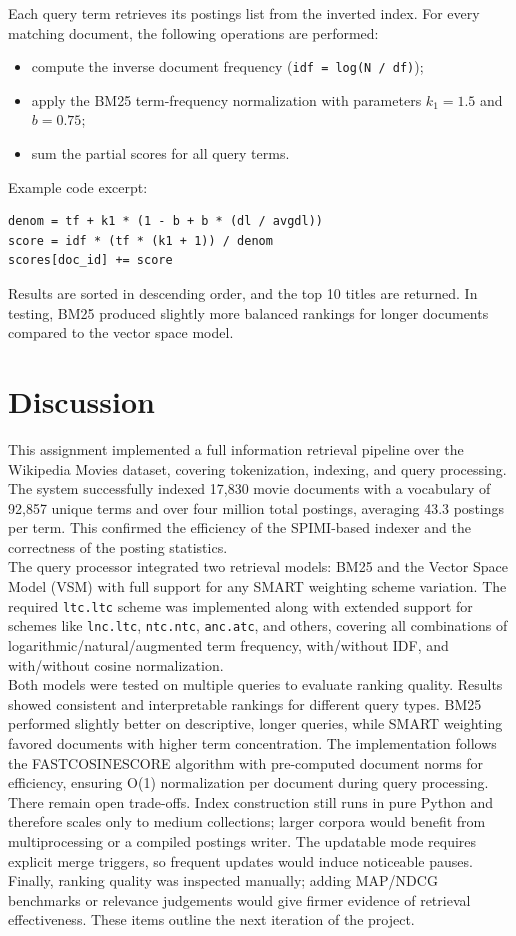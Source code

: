\documentclass[11pt,a4paper]{article}
\begin{document}
Each query term retrieves its postings list from the inverted index. 
For every matching document, the following operations are performed:
\begin{itemize}
    \item compute the inverse document frequency (\texttt{idf = log(N / df)});
    \item apply the BM25 term-frequency normalization with parameters $k_1=1.5$ and $b=0.75$;
    \item sum the partial scores for all query terms.
\end{itemize}

Example code excerpt:
\begin{verbatim}
denom = tf + k1 * (1 - b + b * (dl / avgdl))
score = idf * (tf * (k1 + 1)) / denom
scores[doc_id] += score
\end{verbatim}

Results are sorted in descending order, and the top 10 titles are returned. 
In testing, BM25 produced slightly more balanced rankings for longer documents 
compared to the vector space model.
\newpage
\section{Discussion}
\label{sec:conclusion}
This assignment implemented a full information retrieval pipeline over the Wikipedia Movies dataset, 
covering tokenization, indexing, and query processing. 
The system successfully indexed 17,830 movie documents with a vocabulary of 92,857 unique terms 
and over four million total postings, averaging 43.3 postings per term. 
This confirmed the efficiency of the SPIMI-based indexer and the correctness of the posting statistics.
\\
The query processor integrated two retrieval models: 
BM25 and the Vector Space Model (VSM) with full support for any SMART weighting scheme variation. 
The required \texttt{ltc.ltc} scheme was implemented along with extended support for schemes like 
\texttt{lnc.ltc}, \texttt{ntc.ntc}, \texttt{anc.atc}, and others, covering all combinations of 
logarithmic/natural/augmented term frequency, with/without IDF, and with/without cosine normalization.
\\
Both models were tested on multiple queries to evaluate ranking quality. 
Results showed consistent and interpretable rankings for different query types. 
BM25 performed slightly better on descriptive, longer queries, while SMART weighting favored 
documents with higher term concentration. The implementation follows the FASTCOSINESCORE algorithm 
with pre-computed document norms for efficiency, ensuring O(1) normalization per document during 
query processing.
\\
There remain open trade-offs. Index construction still runs in pure Python and therefore
scales only to medium collections; larger corpora would benefit from multiprocessing or a
compiled postings writer. The updatable mode requires explicit merge triggers, so frequent
updates would induce noticeable pauses. Finally, ranking quality was inspected manually;
adding MAP/NDCG benchmarks or relevance judgements would give firmer evidence of retrieval
effectiveness. These items outline the next iteration of the project.
\end{document}
